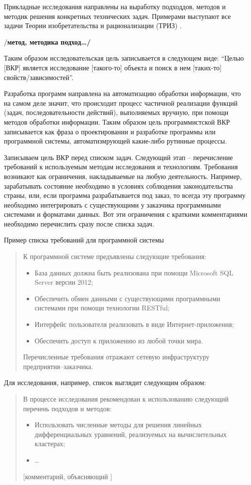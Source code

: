 \documentclass[a4paper,14pt,final]{extreport}
\newcommand{\todo}[1]{{/\bfseries #1\ldots/}}
\begin{document}
Прикладные исследования направлены на выработку подходдов, методов и методик решения конкретных технических задач.  Примерами выступают все задачи Теории изобретательства и рационализации (ТРИЗ) \cite{altov}.

\todo{метод, методика подход}

Таким образом исследовательская цель записывается в следующем виде: ``Целью [ВКР] является исследование [такого-то] объекта и поиск в нем [таких-то] свойств/зависимостей''.

Разработка программ направлена на автоматизацию обработки информации, что на самом деле значит, что происходит процесс частичной реализации функций (задач, последовательности действий), выполняемых вручную, при помощи методов обработки информации.  Таким образом цель программистской ВКР записывается как фраза о проектировании и разработке программы или программной системы, автоматизмрующей какие-либо рутинные процессы.

Записываем цель ВКР перед списком задач.  Следующий этап -- перечисление требований к используемым методам исследования и технологиям.  Требования возникают как ограничения, накладываемые на любую деятельность.  Например, зарабатывать состояние необходимо в условиях соблюдения законодательства страны, или, если программа разрабатывается под заказ, то всегда эту программу необходимо интегрировать с существующими у заказчика программными системами и форматами данных.  Вот эти ограничения с краткими комментариями необходимо перечислить сразу после списка задач.

Пример списка требований для программной системы
\begin{quote}
  К программной системе предъявлены следующие требования:
  \begin{itemize}
  \item База данных должна быть реализована при помощи Microsoft SQL Server версии 2012;
  \item Обеспечить обмен данными с существующими программными системами при помощи технологии RESTful;
  \item Интерфейс пользователя реализовать в виде Интернет-приложения;
  \item Обеспечить доступ к приложению из любой точки мира.
  \end{itemize}
   Перечисленные требования отражают сетевую инфраструктуру предприятия--заказчика.
\end{quote}

Для исследования, например, список выглядит следующим образом:
\begin{quote}
  В процессе исследования рекомендован к использованию следующий перечень подходов и методов:
  \begin{itemize}
  \item Использовать численные методы для решения линейных дифференциальных уравнений, реализуемых на вычислительных кластерах;
  \item \ldots{}
  \end{itemize}
[комментарий, объясняющий ]
\end{quote}
\end{document}
